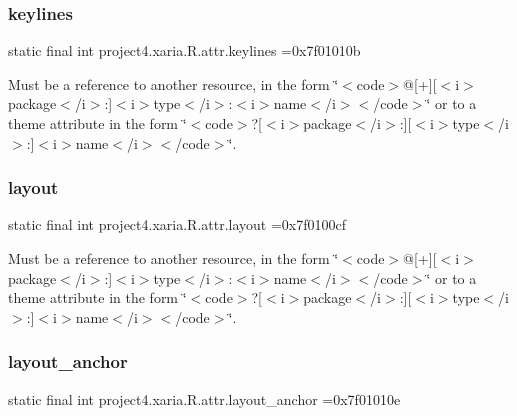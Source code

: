 \subsubsection{\texorpdfstring{keylines}{keylines}}
{\footnotesize\ttfamily static final int project4.\+xaria.\+R.\+attr.\+keylines =0x7f01010b\hspace{0.3cm}{\ttfamily [static]}}

Must be a reference to another resource, in the form \char`\"{}$<$code$>$@\mbox{[}+\mbox{]}\mbox{[}$<$i$>$package$<$/i$>$\+:\mbox{]}$<$i$>$type$<$/i$>$\+:$<$i$>$name$<$/i$>$$<$/code$>$\char`\"{} or to a theme attribute in the form \char`\"{}$<$code$>$?\mbox{[}$<$i$>$package$<$/i$>$\+:\mbox{]}\mbox{[}$<$i$>$type$<$/i$>$\+:\mbox{]}$<$i$>$name$<$/i$>$$<$/code$>$\char`\"{}. \mbox{\label{classproject4_1_1xaria_1_1R_1_1attr_aeaac1998aa821203d8671de8264b55b7}} 
\subsubsection{\texorpdfstring{layout}{layout}}
{\footnotesize\ttfamily static final int project4.\+xaria.\+R.\+attr.\+layout =0x7f0100cf\hspace{0.3cm}{\ttfamily [static]}}

Must be a reference to another resource, in the form \char`\"{}$<$code$>$@\mbox{[}+\mbox{]}\mbox{[}$<$i$>$package$<$/i$>$\+:\mbox{]}$<$i$>$type$<$/i$>$\+:$<$i$>$name$<$/i$>$$<$/code$>$\char`\"{} or to a theme attribute in the form \char`\"{}$<$code$>$?\mbox{[}$<$i$>$package$<$/i$>$\+:\mbox{]}\mbox{[}$<$i$>$type$<$/i$>$\+:\mbox{]}$<$i$>$name$<$/i$>$$<$/code$>$\char`\"{}. \mbox{\label{classproject4_1_1xaria_1_1R_1_1attr_ab500d7f146cf628ea14cedaad13c94ea}} 
\subsubsection{\texorpdfstring{layout\+\_\+anchor}{layout\_anchor}}
{\footnotesize\ttfamily static final int project4.\+xaria.\+R.\+attr.\+layout\+\_\+anchor =0x7f01010e\hspace{0.3cm}{\ttfamily [static]}}

